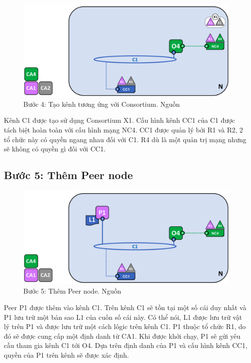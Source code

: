 \documentclass[../DoAn.tex]{subfiles}
\begin{document}
\begin{figure}[h]
  \centering
  \includegraphics[width=0.75\linewidth]{Hinhve/network.diagram.4.png}
  \caption[Bước 4: Tạo kênh tương ứng với Consortium]{Bước 4: Tạo kênh tương ứng với Consortium. Nguồn \cite{fabric_architecture}}
  \label{fig:fabric_step_4}
\end{figure}

Kênh C1 được tạo sử dụng Consortium X1. Cấu hình kênh CC1 của C1 được tách biệt
hoàn toàn với cấu hình mạng NC4. CC1 được quản lý bởi R1 và R2, 2 tổ chức này
có quyền ngang nhau đối với C1. R4 dù là một quản trị mạng nhưng sẽ không có
quyền gì đối với CC1.

\subsection{Bước 5: Thêm Peer node}

\begin{figure}[h]
  \centering
  \includegraphics[width=0.75\linewidth]{Hinhve/network.diagram.5.png}
  \caption[Bước 5: Thêm Peer node]{Bước 5: Thêm Peer node. Nguồn \cite{fabric_architecture}}
  \label{fig:fabric_step_5}
\end{figure}

Peer P1 được thêm vào kênh C1. Trên kênh C1 sẽ tồn tại một số cái duy nhất và
P1 lưu trữ một bản sao L1 của cuốn số cái này. Có thể nói, L1 được lưu trữ vật
lý trên P1 và được lưu trữ một cách lôgic trên kênh C1. P1 thuộc tổ chức R1,
do đó sẽ được cung cấp một định danh từ CA1. Khi được khởi chạy, P1 sẽ gửi yêu
cầu tham gia kênh C1 tới O4. Dựa trên định danh của P1 và cấu hình kênh CC1,
quyền của P1 trên kênh sẽ được xác định.
\end{document}
